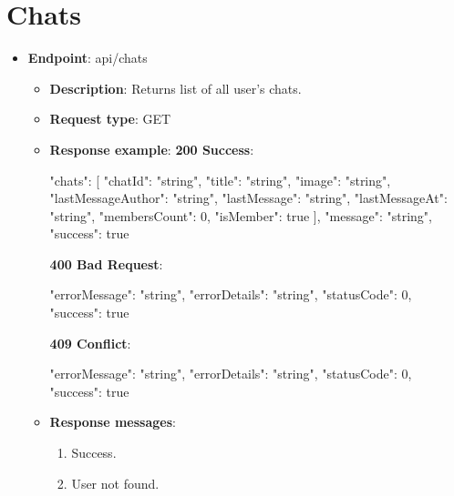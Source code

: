 \section{Chats}\label{sec:chats}
\begin{itemize}
    \item \textbf{Endpoint}: api/chats
    \begin{itemize}
        \item \textbf{Description}: Returns list of all user's chats.
        \item \textbf{Request type}: GET
        \item \textbf{Response example}:
        \textbf{200 Success}:
        \begin{spverbatim}
        {
            "chats": [
                {
                "chatId": "string",
                "title": "string",
                "image": "string",
                "lastMessageAuthor": "string",
                "lastMessage": "string",
                "lastMessageAt": "string",
                "membersCount": 0,
                "isMember": true
            }
            ],
            "message": "string",
            "success": true
        }
        \end{spverbatim}
        \textbf{400 Bad Request}:
        \begin{spverbatim}
        {
            "errorMessage": "string",
            "errorDetails": "string",
            "statusCode": 0,
            "success": true
        }
        \end{spverbatim}
        \textbf{409 Conflict}:
        \begin{spverbatim}
        {
            "errorMessage": "string",
            "errorDetails": "string",
            "statusCode": 0,
            "success": true
        }
        \end{spverbatim}
        \item \textbf{Response messages}:
        \begin{enumerate}
            \item Success.
            \item User not found.
        \end{enumerate}
    \end{itemize}


\end{itemize}
